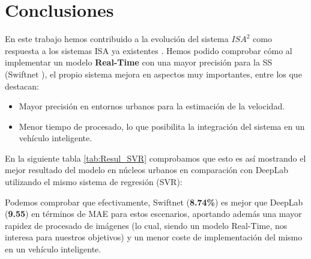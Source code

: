 \chapter{Conclusiones}

En este trabajo hemos contribuido a la evolución del sistema $ISA^{2}$ como respuesta a los sistemas \ac{ISA} ya existentes \cite{isa2}. Hemos podido comprobar cómo al implementar un modelo \textbf{Real-Time} con una mayor precisión para la \ac{SS} (Swiftnet \cite{swiftnet}), el propio sistema mejora en aspectos muy importantes, entre los que destacan:

\begin{itemize}
\item Mayor precisión en entornos urbanos para la estimación de la velocidad.
\item Menor tiempo de procesado, lo que posibilita la integración del sistema en un vehículo inteligente.
\end{itemize}


En la siguiente tabla \ref{tab:Resul_SVR} comprobamos que esto es así mostrando el mejor resultado del modelo en núcleos urbanos en comparación con DeepLab utilizando el mismo sistema de regresión (\ac{SVR}): 

\begin{table}[H]
\centering
{}
\caption{Resultados y \ac{SVR}}
\label{tab:Resul_SVR}
\end{table}

Podemos comprobar que efectivamente, Swiftnet (\textbf{8.74\%}) es mejor que DeepLab (\textbf{9.55}) en términos de MAE para estos escenarios, aportando además una mayor rapidez de procesado de imágenes (lo cual, siendo un modelo Real-Time, nos interesa para nuestros objetivos) y un menor coste de implementación del mismo en un vehículo inteligente. 

